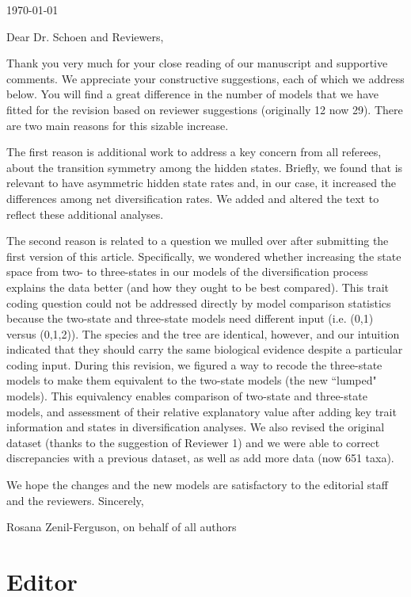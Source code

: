 \documentclass[11pt]{article}
\begin{document}
\hfill \today

Dear Dr. Schoen and Reviewers,

\medskip

 
Thank you very much for your close reading of our manuscript and supportive comments. We appreciate your constructive suggestions, each of which we address below. You will find a great difference in the number of models that we have fitted for the revision based on reviewer suggestions (originally 12 now 29). There are two main reasons for this sizable increase. 

The first reason is additional work to address a key concern from all referees, about the transition symmetry among the hidden states. 
Briefly, we found that is relevant to have asymmetric hidden state rates and, in our case, it increased the differences among net diversification rates. 
We added and altered the text to reflect these additional analyses. 


The second reason is related to a question we mulled over after submitting the first version of this article. Specifically, we wondered whether increasing the state space from two- to three-states in our models of the diversification process explains the data better (and how they ought to be best compared). 
This  trait coding question could not be addressed directly by model comparison statistics because the two-state and three-state models need different input (i.e. (0,1) versus (0,1,2)). 
The species and the tree are identical, however, and our intuition indicated that they should carry the same biological evidence despite a particular coding input. 
During this revision, we figured a way to recode the three-state models to make them equivalent to the two-state models (the new ``lumped" models). 
This equivalency enables comparison of two-state and three-state models, and assessment of their relative explanatory value after adding key trait information and states in diversification analyses. 
We also revised the original dataset (thanks to the suggestion of Reviewer 1) and we were able to correct discrepancies with a previous dataset, as well as add more data (now 651 taxa).

We hope the changes and the new models are satisfactory to the editorial staff and the reviewers.
\medskip
Sincerely,

Rosana Zenil-Ferguson, on behalf of all authors


\section{Editor}
\vspace{-11pt}
\end{document}
